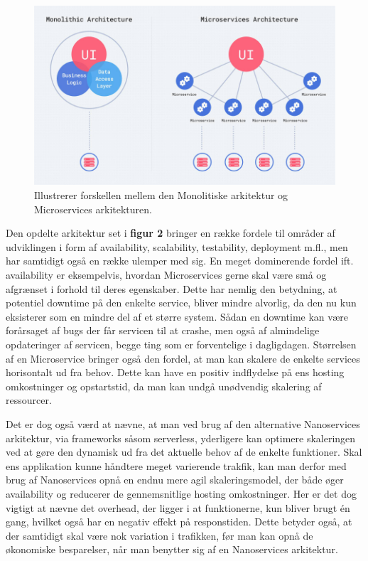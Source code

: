 \documentclass{article}
\begin{document}
\begin{flushleft}
\begin{figure}[H]
    \captionsetup{justification=raggedright,singlelinecheck=false}
    \includegraphics[width=\textwidth]{monolithic and Microservices.jpg}
    \caption{Illustrerer forskellen mellem den Monolitiske arkitektur og Microservices arkitekturen.\cite{micro8}  \label{figure:mono micro}}
\end{figure}
Den opdelte arkitektur set i \textbf{figur 2} bringer en række fordele til områder af udviklingen i form af availability, scalability, testability, deployment m.fl., men har samtidigt også en række ulemper med sig.\cite{mono2} En meget dominerende fordel ift. availability er eksempelvis, hvordan Microservices gerne skal være små og afgrænset i forhold til deres egenskaber.\cite{micro1} Dette har nemlig den betydning, at potentiel downtime på den enkelte service, bliver mindre alvorlig, da den nu kun eksisterer som en mindre del af et større system. Sådan en downtime kan være forårsaget af bugs der får servicen til at crashe, men også af almindelige opdateringer af servicen, begge ting som er forventelige i dagligdagen. Størrelsen af en Microservice bringer også den fordel, at man kan skalere de enkelte services horisontalt ud fra behov. Dette kan have en positiv indflydelse på ens hosting omkostninger og opstartstid, da man kan undgå unødvendig skalering af ressourcer.\cite{micro9} \linebreak

Det er dog også værd at nævne, at man ved brug af den alternative Nanoservices arkitektur\cite{nano}, via frameworks såsom serverless\cite{serverless}, yderligere kan optimere skaleringen ved at gøre den dynamisk ud fra det aktuelle behov af de enkelte funktioner. Skal ens applikation kunne håndtere meget varierende trakfik, kan man derfor med brug af Nanoservices opnå en endnu mere agil skaleringsmodel, der både øger availability og reducerer de gennemsnitlige hosting omkostninger.\cite{micro3} Her er det dog vigtigt at nævne det overhead, der ligger i at funktionerne, kun bliver brugt én gang, hvilket også har en negativ effekt på responstiden. Dette betyder også, at der samtidigt skal være nok variation i trafikken, før man kan opnå de økonomiske besparelser, når man benytter sig af en Nanoservices arkitektur.\linebreak


\end{flushleft}
\end{document}
